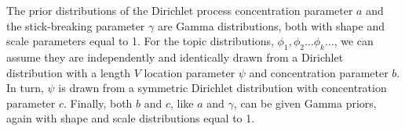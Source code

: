 The prior distributions of the Dirichlet process concentration parameter $a$
and the stick-breaking parameter $\gamma$ are Gamma distributions, both with
shape and scale parameters equal to 1. For the topic distributions, $\phi_1,
\phi_2 \ldots \phi_k \ldots$, we can assume they are independently and
identically drawn from a Dirichlet distribution with a length $V$ location
parameter $\psi$ and concentration parameter $b$. In turn, $\psi$ is drawn from
a symmetric Dirichlet distribution with concentration parameter $c$. Finally,
both $b$ and $c$, like $a$ and $\gamma$, can be given Gamma priors, again with
shape and scale distributions equal to 1.

